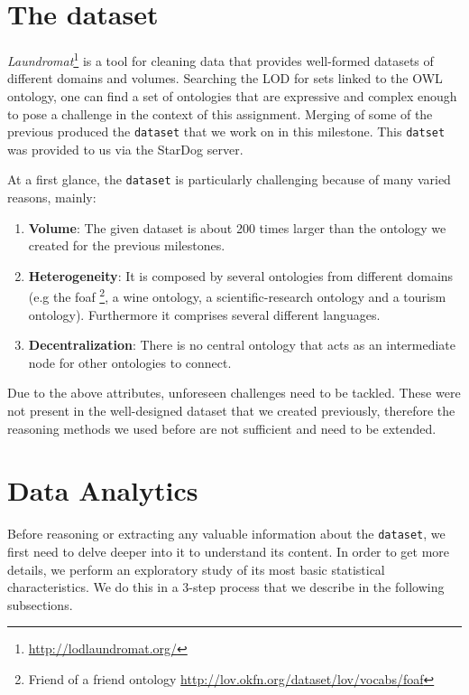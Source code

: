 \documentclass[runningheads,a4paper]{../../StyleFiles/llncs}
\begin{document}

\section{The dataset}
\textit{Laundromat}\footnote{\url{http://lodlaundromat.org/}} is a tool for cleaning data that provides well-formed datasets of different domains and volumes. Searching the LOD for sets linked to the OWL ontology, one can find a set of ontologies that are expressive and complex enough to pose a challenge in the context of this assignment. Merging of some of the previous produced the \texttt{dataset} that we work on in this milestone. This \texttt{datset} was provided to us via the StarDog server. 

At a first glance, the \texttt{dataset} is particularly challenging because of many varied reasons, mainly:

\begin{enumerate}
	\item \textbf{Volume}: The given dataset is about 200 times larger than the ontology we created for the previous milestones.
	\item \textbf{Heterogeneity}: It is composed by several ontologies from different domains (e.g the foaf \footnote{Friend of a friend ontology \url{http://lov.okfn.org/dataset/lov/vocabs/foaf}}, a wine ontology, a scientific-research ontology and a tourism ontology). Furthermore it comprises several different languages.
	\item \textbf{Decentralization}: There is no central ontology that acts as an intermediate node for other ontologies to connect.
\end{enumerate}

Due to the above attributes, unforeseen challenges need to be tackled. These were not present in the well-designed dataset that we created previously, therefore the reasoning methods we used before are not sufficient and need to be extended.

\section{Data Analytics}
Before reasoning or extracting any valuable information about the \texttt{dataset}, we first need to delve deeper into it to understand its content. In order to get more details, we perform an exploratory study of its most basic statistical characteristics. We do this in a 3-step process that we describe in the following subsections.
\end{document}
